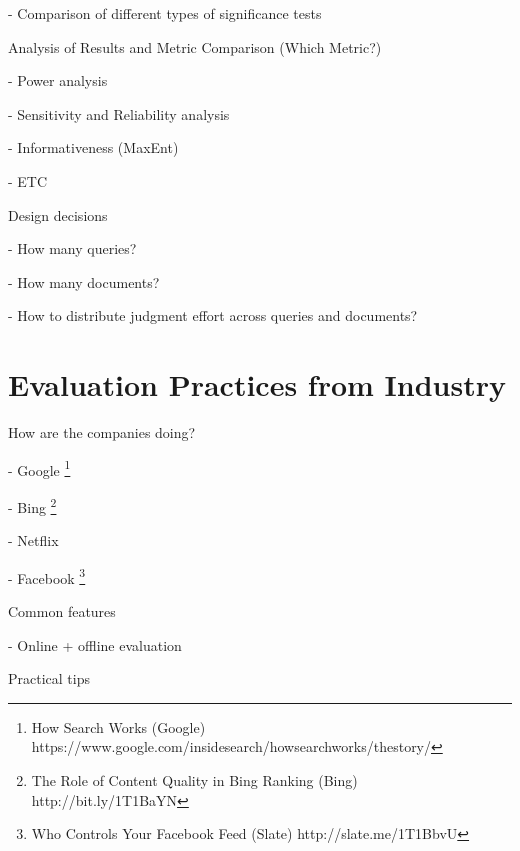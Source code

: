 \documentclass[openany]{now} %
\newcommand{\newpar}{\bigskip\noindent}
\begin{document}
- Comparison of different types of significance tests \cite{SmuckerAC09}

\newpar
Analysis of Results and Metric Comparison (Which Metric?)

- Power analysis \cite{Sakai:2014}

- Sensitivity and Reliability analysis \cite{Urbano:2013} 

- Informativeness (MaxEnt) \cite{AslamYP05}

- ETC \cite{Bron:2013} \cite{Boytsov:2013}  \cite{Robertson:2012}


\newpar
Design decisions

- How many queries? \cite{Sakai:2014}

- How many documents? \cite{CarterettePFK09}

- How to distribute judgment effort across queries and documents? \cite{CarterettePKAA09, YilmazR09}

\chapter{Evaluation Practices from Industry}

How are the companies doing?

-	Google \footnote{How Search Works (Google) https://www.google.com/insidesearch/howsearchworks/thestory/}

-	Bing \footnote{The Role of Content Quality in Bing Ranking (Bing)
	 http://bit.ly/1T1BaYN}

-	Netflix \cite{Gomez-Uribe2015}

-	Facebook \footnote{Who Controls Your Facebook Feed (Slate) http://slate.me/1T1BbvU}

\newpar
Common features

- Online + offline evaluation

\newpar
Practical tips


\backmatter  %



	
\end{document}
